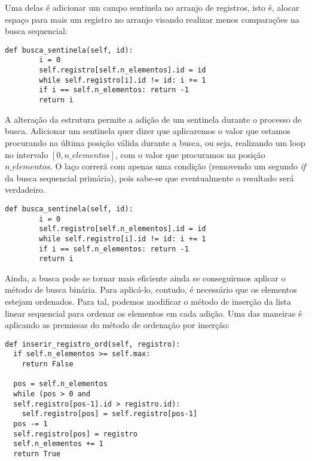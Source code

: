 \documentclass[a4paper, twocolumn]{article}
\theoremstyle{definition}
\begin{document}
Uma delas é adicionar um campo sentinela no arranjo de registros, isto é, alocar espaço para mais um registro no arranjo visando realizar menos comparações na busca sequencial:

\begin{lstlisting}[label=lista_linear_seq_sentinela,caption= Lista linear sequencial com sentinela (estrutura)]
def busca_sentinela(self, id):
        i = 0
        self.registro[self.n_elementos].id = id
        while self.registro[i].id != id: i += 1
        if i == self.n_elementos: return -1        
        return i
\end{lstlisting}

A alteração da estrutura permite a adição de um sentinela durante o processo de busca. Adicionar um sentinela quer dizer que aplicaremos o valor que estamos procurando na última posição válida durante a busca, ou seja, realizando um loop no intervalo $[0, n\_elementos]$, com o valor que procuramos na posição $n\_elementos$. O laço correrá com apenas uma condição (removendo um segundo \textit{if} da busca sequencial primária), pois sabe-se que eventualmente o resultado será verdadeiro.

\begin{lstlisting}[label=lista_linear_seq_sentinela_busca,caption= Lista linear sequencial com sentinela (busca)]
def busca_sentinela(self, id):
        i = 0
        self.registro[self.n_elementos].id = id
        while self.registro[i].id != id: i += 1
        if i == self.n_elementos: return -1        
        return i
\end{lstlisting}

Ainda, a busca pode se tornar mais eficiente ainda se conseguirmos aplicar o método de busca binária. Para aplicá-lo, contudo, é necessário que os elementos estejam ordenados. Para tal, podemos modificar o método de inserção da lista linear sequencial para ordenar os elementos em cada adição. Uma das maneiras é aplicando as premissas do método de ordenação por inserção:

\begin{lstlisting}[label=lista_linear_ord_inserir,caption= Lista linear sequencial ordenada (inserção)]
def inserir_registro_ord(self, registro):
  if self.n_elementos >= self.max:
    return False

  pos = self.n_elementos
  while (pos > 0 and 
  self.registro[pos-1].id > registro.id):
    self.registro[pos] = self.registro[pos-1]
  pos -= 1
  self.registro[pos] = registro
  self.n_elementos += 1
  return True
\end{lstlisting}
\end{document}
